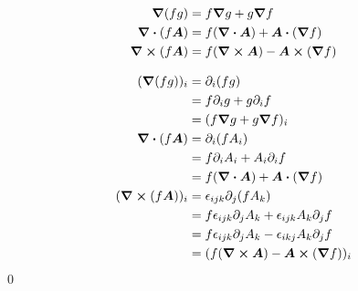 \documentclass[uplatex,dvipdfmx,a4paper,11pt]{jlreq}
\makeatletter
\newcommand{\rot}{\curl}
\theoremstyle{definition}
\renewenvironment{proof}[1][\proofname]{\par
  \normalfont
  \topsep6\p@\@plus6\p@ \trivlist
  \item[\hskip\labelsep{\bfseries #1}\@addpunct{\bfseries}]\ignorespaces\quad\par
}{%
  \qed\endtrivlist\@endpefalse
}
\renewcommand\proofname{証明}
\makeatother
\begin{document}
\begin{theorem}[勾配・発散・回転のスカラー倍]
  \begin{align}
    \grad{(fg)}     & = f\grad{g} + g\grad{f}                    \\
    \div{(f\bm{A})} & = f(\div{\bm{A}}) + \bm{A}\vdot(\grad{f})  \\
    \rot{(f\bm{A})} & = f(\rot{\bm{A}}) - \bm{A}\cross(\grad{f})
  \end{align}
\end{theorem}
\begin{proof}
  \begin{align}
    (\grad{(fg)})_i     & = \partial_i(fg)                                              \\
                        & = f\partial_i g + g\partial_i f                               \\
                        & = (f\grad{g} + g\grad{f})_i                                   \\
    \div{(f\bm{A})}     & = \partial_i(fA_i)                                            \\
                        & = f\partial_iA_i + A_i\partial_if                             \\
                        & = f(\div{\bm{A}}) + \bm{A}\vdot(\grad{f})                     \\
    (\rot{(f\bm{A})})_i & = \epsilon_{ijk}\partial_j(fA_k)                              \\
                        & = f\epsilon_{ijk}\partial_jA_k + \epsilon_{ijk}A_k\partial_jf \\
                        & = f\epsilon_{ijk}\partial_jA_k - \epsilon_{ikj}A_k\partial_jf \\
                        & = (f(\rot{\bm{A}}) - \bm{A}\cross(\grad{f}))_i
  \end{align}
\end{proof}
\end{document}
